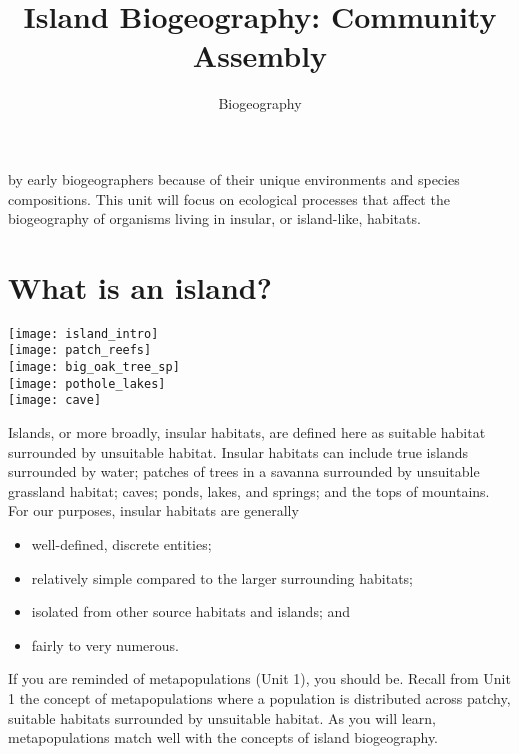 \documentclass{tufte-handout}
\title{Island Biogeography: Community Assembly}
\author{Biogeography}
\date{}
\begin{document}
\maketitle	%



 by early biogeographers because of their unique environments and species compositions.  This unit will focus on ecological processes that affect the biogeography of organisms living in insular, or island-like, habitats. 

\section{What is an island?}\label{sec:island}
\begin{marginfigure}%
	\centering
	\texttt{[image: island\_intro]}\\
	\texttt{[image: patch\_reefs]}\\
	\texttt{[image: big\_oak\_tree\_sp]}\\
	\texttt{[image: pothole\_lakes]}\\
	\texttt{[image: cave]}
\end{marginfigure} 

Islands, or more broadly, insular habitats, are defined here as suitable habitat surrounded by unsuitable habitat. Insular habitats can include true islands surrounded by water; patches of trees in a savanna surrounded by unsuitable grassland habitat; caves; ponds, lakes, and springs; and the tops of mountains. For our purposes, insular habitats are generally
\begin{itemize}
	\item well-defined, discrete entities; 
	\item relatively simple compared to the larger surrounding habitats;
	\item isolated from other source habitats and islands; and
	\item fairly to very numerous.
\end{itemize}

If you are reminded of metapopulations (Unit 1), you should be.  Recall from Unit 1 the concept of metapopulations where a population is distributed across patchy, suitable habitats surrounded by unsuitable habitat. As you will learn, metapopulations match well with the concepts of island biogeography. 
\end{document}
